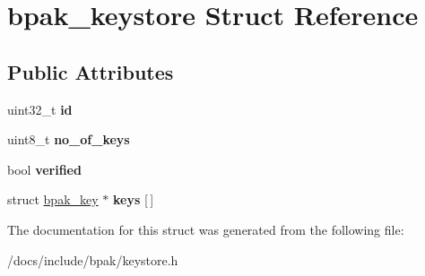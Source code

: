 \hypertarget{structbpak__keystore}{}\section{bpak\+\_\+keystore Struct Reference}
\label{structbpak__keystore}
\subsection*{Public Attributes}
\begin{DoxyCompactItemize}
\item 
\mbox{\label{structbpak__keystore_ac07e3fe9558d7aaffe810fb5961097d8}} 
uint32\+\_\+t {\bfseries id}
\item 
\mbox{\label{structbpak__keystore_a2f85ae44f941cc9486f4f864949df5d1}} 
uint8\+\_\+t {\bfseries no\+\_\+of\+\_\+keys}
\item 
\mbox{\label{structbpak__keystore_acaa70c61c3b38511e7361cb540eb5c41}} 
bool {\bfseries verified}
\item 
\mbox{\label{structbpak__keystore_a59dfda3d8b648830c109918d768f8b42}} 
struct \hyperlink{structbpak__key}{bpak\+\_\+key} $\ast$ {\bfseries keys} \mbox{[}$\,$\mbox{]}
\end{DoxyCompactItemize}


The documentation for this struct was generated from the following file\+:\begin{DoxyCompactItemize}
\item 
/docs/include/bpak/keystore.\+h\end{DoxyCompactItemize}

